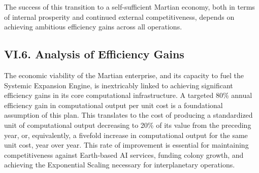 \documentclass[fontsize=10pt, oneside, DIV=calc]{scrartcl}
\begin{document}
\medskip

\noindent
The success of this transition to a self-sufficient Martian economy, both in terms of internal prosperity and continued external competitiveness, depends on achieving ambitious efficiency gains across all operations.



\subsection*{VI.6. Analysis of Efficiency Gains}



\medskip

\noindent
The economic viability of the Martian enterprise, and its capacity to fuel the Systemic Expansion Engine, is inextricably linked to achieving significant efficiency gains in its core computational infrastructure. A targeted 80\% annual efficiency gain in computational output per unit cost is a foundational assumption of this plan. This translates to the cost of producing a standardized unit of computational output decreasing to 20\% of its value from the preceding year, or, equivalently, a fivefold increase in computational output for the same unit cost, year over year. This rate of improvement is essential for maintaining competitiveness against Earth-based AI services, funding colony growth, and achieving the Exponential Scaling necessary for interplanetary operations.

\medskip
\end{document}
